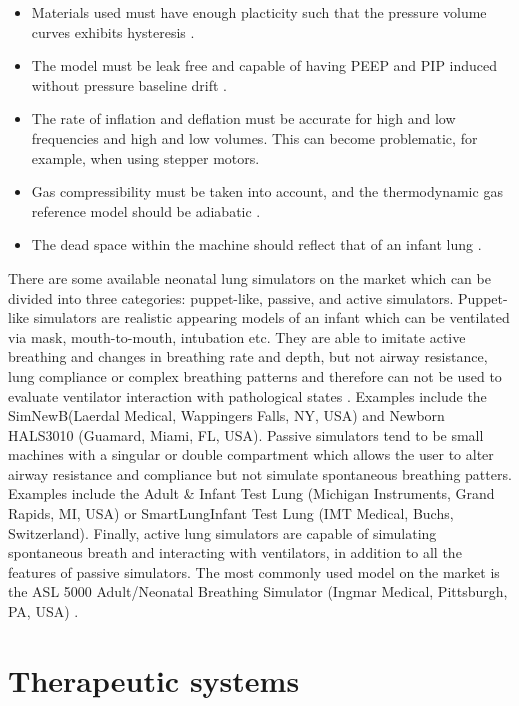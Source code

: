 \documentclass[12pt, openany, oneside]{book}
\begin{document}
\begin{itemize}
	\item{Materials used must have enough placticity such that the pressure volume curves exhibits hysteresis \citep{scara2013}.}
	\item{The model must be leak free and capable of having PEEP and PIP induced without pressure baseline drift \citep{stank2017}.}
	\item{The rate of inflation and deflation must be accurate for high and low frequencies and high and low volumes. This can become problematic, for example, when using stepper motors.}
	\item{Gas compressibility must be taken into account, and the thermodynamic gas reference model should be adiabatic \citep{cecchini2011}.}
	\item{The dead space within the machine should reflect that of an infant lung \citep{thomas}.}

\end{itemize}

There are some available neonatal lung simulators on the market which can be divided into three categories: puppet-like, passive, and active simulators. Puppet-like simulators are realistic appearing models of an infant which can be ventilated via mask, mouth-to-mouth, intubation etc. They are able to imitate active breathing and changes in breathing rate and depth, but not airway resistance, lung compliance or complex breathing patterns and therefore can not be used to evaluate ventilator interaction with pathological states \citep{stank2017, scara2013}. Examples include the SimNewB\textregistered (Laerdal Medical, Wappingers Falls, NY, USA) and Newborn HAL\textregistered S3010 (Guamard, Miami, FL, USA). Passive simulators tend to be small machines with a singular or double compartment which allows the user to alter airway resistance and compliance but not simulate spontaneous breathing patters. Examples include the Adult {\&} Infant Test Lung (Michigan Instruments, Grand Rapids, MI, USA) or SmartLung\texttrademark Infant Test Lung (IMT Medical, Buchs, Switzerland). Finally, active lung simulators are capable of simulating spontaneous breath and interacting with ventilators, in addition to all the features of passive simulators. The most commonly used model on the market is the ASL 5000 Adult/Neonatal Breathing Simulator (Ingmar Medical, Pittsburgh, PA, USA) \citep{scara2013}. 




\section{Therapeutic systems}
\end{document}
